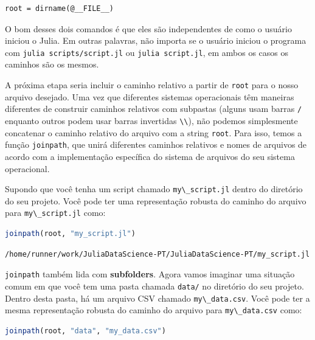 \documentclass[
  notoc %
]{tufte-book}
\newcommand{\passthrough}[1]{#1}
\begin{document}
\begin{lstlisting}
root = dirname(@__FILE__)
\end{lstlisting}

O bom desses dois comandos é que eles são independentes de como o
usuário iniciou o Julia. Em outras palavras, não importa se o usuário
iniciou o programa com \passthrough{\lstinline!julia scripts/script.jl!}
ou \passthrough{\lstinline!julia script.jl!}, em ambos os casos os
caminhos são os mesmos.

A próxima etapa seria incluir o caminho relativo a partir de
\passthrough{\lstinline!root!} para o nosso arquivo desejado. Uma vez
que diferentes sistemas operacionais têm maneiras diferentes de
construir caminhos relativos com subpastas (alguns usam barras
\passthrough{\lstinline!/!} enquanto outros podem usar barras invertidas
\passthrough{\lstinline!\\!}), não podemos simplesmente concatenar o
caminho relativo do arquivo com a string \passthrough{\lstinline!root!}.
Para isso, temos a função \passthrough{\lstinline!joinpath!}, que unirá
diferentes caminhos relativos e nomes de arquivos de acordo com a
implementação específica do sistema de arquivos do seu sistema
operacional.

Supondo que você tenha um script chamado
\passthrough{\lstinline!my\_script.jl!} dentro do diretório do seu
projeto. Você pode ter uma representação robusta do caminho do arquivo
para \passthrough{\lstinline!my\_script.jl!} como:

\begin{lstlisting}[language=Julia]
joinpath(root, "my_script.jl")
\end{lstlisting}

\begin{lstlisting}[language=Output]
/home/runner/work/JuliaDataScience-PT/JuliaDataScience-PT/my_script.jl
\end{lstlisting}

\passthrough{\lstinline!joinpath!} também lida com \textbf{subfolders}.
Agora vamos imaginar uma situação comum em que você tem uma pasta
chamada \passthrough{\lstinline!data/!} no diretório do seu projeto.
Dentro desta pasta, há um arquivo CSV chamado
\passthrough{\lstinline!my\_data.csv!}. Você pode ter a mesma
representação robusta do caminho do arquivo para
\passthrough{\lstinline!my\_data.csv!} como:

\begin{lstlisting}[language=Julia]
joinpath(root, "data", "my_data.csv")
\end{lstlisting}
\end{document}
